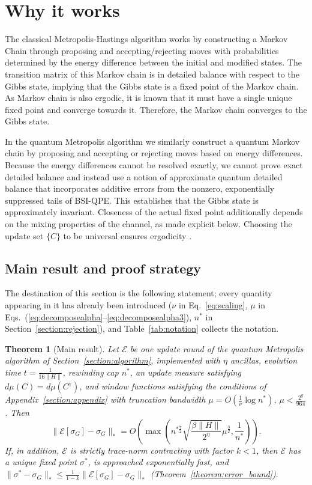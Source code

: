 \documentclass[aps,floatfix,10pt,amssymb,amsfont,amsmath,superscriptaddress,float,nofootinbib,longbibliography,nobalancelastpage,twocolumn]{revtex4-2}
\newtheorem{theorem}{Theorem}
\begin{document}
\section{Why it works}
\label{section:why}
The classical Metropolis-Hastings algorithm works by constructing a Markov Chain through proposing and accepting/rejecting moves with probabilities determined by the energy difference between the initial and modified states. The transition matrix of this Markov chain is in detailed balance with respect to the Gibbs state, implying that the Gibbs state is a fixed point of the Markov chain. As Markov chain is also ergodic, it is known that it must have a single unique fixed point and converge towards it. Therefore, the Markov chain converges to the Gibbs state.

In the quantum Metropolis algorithm we similarly construct a quantum Markov chain by proposing and accepting or rejecting moves based on energy differences. Because the energy differences cannot be resolved exactly, we cannot prove exact detailed balance and instead use a notion of approximate quantum detailed balance that incorporates additive errors from the nonzero, exponentially suppressed tails of BSI-QPE. This establishes that the Gibbs state is approximately invariant. Closeness of the actual fixed point additionally depends on the mixing properties of the channel, as made explicit below. Choosing the update set $\{C\}$ to be universal ensures ergodicity \cite{Temme_2011}.

\subsection{Main result and proof strategy}
\label{subsec:main}
The destination of this section is the following statement; every quantity appearing in it has already been introduced ($\nu$ in Eq.~\eqref{eq:scaling}, $\mu$ in Eqs.~(\ref{eq:decomposealpha}--\ref{eq:decomposealpha3}), $n^*$ in Section~\ref{section:rejection}), and Table~\ref{tab:notation} collects the notation.
\begin{theorem}[Main result]
\label{theorem:main}
Let $\mathcal{E}$ be one update round of the quantum Metropolis algorithm of Section~\ref{section:algorithm}, implemented with $\eta$ ancillas, evolution time $t = \frac{1}{16\|H\|}$, rewinding cap $n^*$, an update measure satisfying $d\mu(C)=d\mu(C^{\dagger})$, and window functions satisfying the conditions of Appendix~\ref{section:appendix} with truncation bandwidth $\mu = O(\frac{1}{\nu}\log n^*)$, $\mu < \frac{2^{\eta}}{96\pi}$. Then
\begin{equation}
   \|\mathcal{E}[\sigma_G] - \sigma_G\|_* = O\left(\max\left( n^{*\frac{7}{2}}\sqrt{\frac{\beta\|H\| }{2^{\eta}}}\mu^{\frac{3}{2}},\frac{1}{n^*}\right)\right).
\end{equation}
If, in addition, $\mathcal{E}$ is strictly trace-norm contracting with factor $k<1$, then $\mathcal{E}$ has a unique fixed point $\sigma^*$, is approached exponentially fast, and $\|\sigma^*-\sigma_G\|_* \leq \frac{1}{1-k}\|\mathcal{E}[\sigma_G] - \sigma_G\|_*$ (Theorem~\ref{theorem:error_bound}).
\end{theorem}
\end{document}
